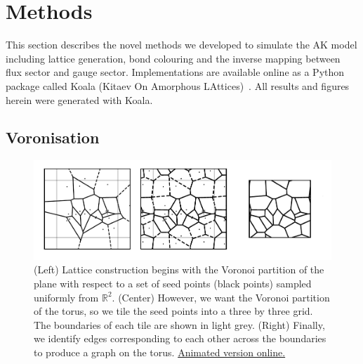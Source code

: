 \hypertarget{amk-methods}{%
\section{Methods}\label{amk-methods}}

This section describes the novel methods we developed to simulate the AK model including lattice generation, bond colouring and the inverse mapping between flux sector and gauge sector. Implementations are available online as a Python package called Koala (Kitaev On Amorphous LAttices)~\autocite{hodsonKoalaKitaevAmorphous2022}. All results and figures herein were generated with Koala.

\hypertarget{voronisation}{%
\subsection{Voronisation}\label{voronisation}}

\hypertarget{fig:lattice_construction_animated}{%
\begin{figure}
\centering
\includegraphics[width=1\textwidth,height=\textheight]{figure_code/amk_chapter/lattice_construction_animated/lattice_construction_animated}
\caption[{Lattice Construction}]{(Left) Lattice construction begins with the Voronoi partition of the plane with respect to a set of seed points (black points) sampled uniformly from \(\mathbb{R}^2\). (Center) However, we want the Voronoi partition of the torus, so we tile the seed points into a three by three grid. The boundaries of each tile are shown in light grey. (Right) Finally, we identify edges corresponding to each other across the boundaries to produce a graph on the torus. \href{http://thomashodson.com/assets/thesis/amk_chapter/lattice_construction_animated/lattice_construction_animated.gif}{ Animated version online.}}
\label{fig:lattice_construction_animated}
\end{figure}
}

